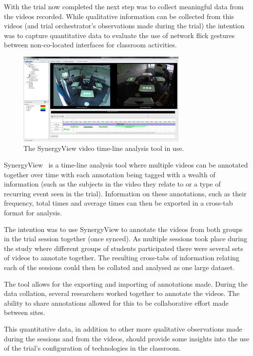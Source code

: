 \documentclass[a4paper,11pt]{article}
\begin{document}
With the trial now completed the next step was to collect meaningful data from the videos recorded.
While qualitative information can be collected from this videos (and trial orchestrator's observations made during the trial) the intention was to capture quantitative data to evaluate the use of network flick gestures between non-co-located interfaces for classroom activities.

\begin{figure}[h]
 \centering
   \includegraphics[width=0.75\textwidth]{figures/synergyviewexample.png}
   \caption{The SynergyView video time-line analysis tool in use.}
   \label{fig:SynergyviewExample}
\end{figure}

SynergyView~\cite{kyaw:2010} is a time-line analysis tool where multiple videos can be annotated together over time with each annotation being tagged with a wealth of information (such as the subjects in the video they relate to or a type of recurring event seen in the trial).
Information on these annotations, such as their frequency, total times and average times can then be exported in a cross-tab format for analysis.

The intention was to use SynergyView to annotate the videos from both groups in the trial session together (once synced).
As multiple sessions took place during the study where different groups of students participated there were several sets of videos to annotate together.
The resulting cross-tabs of information relating each of the sessions could then be collated and analysed as one large dataset.

The tool allows for the exporting and importing of annotations made.
During the data collation, several researchers worked together to annotate the videos.
The ability to share annotations allowed for this to be collaborative effort made between sites. 

This quantitative data, in addition to other more qualitative observations made during the sessions and from the videos, should provide some insights into the use of the trial's configuration of technologies in the classroom.
\end{document}
